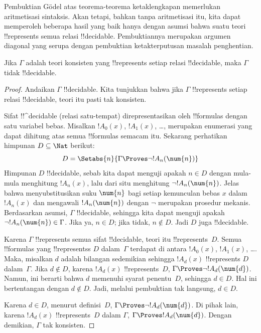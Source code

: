 \documentclass[../../../include/open-logic-section]{subfiles}
\begin{document}


Pembuktian G\"odel atas teorema-teorema ketaklengkapan memerlukan
aritmetisasi sintaksis. Akan tetapi, bahkan tanpa aritmetisasi itu, kita dapat
memperoleh beberapa hasil yang baik hanya dengan asumsi bahwa suatu teori
!!{represents} semua relasi !!{decidable}. Pembuktiannya merupakan argumen
diagonal yang serupa dengan pembuktian ketakterputusan masalah penghentian.

\begin{thm}
Jika $\Gamma$ adalah teori konsisten yang !!{represents} setiap relasi
!!{decidable}, maka $\Gamma$ tidak !!{decidable}.
\end{thm}

\begin{proof}
Andaikan $\Gamma$ !!{decidable}. Kita tunjukkan bahwa jika $\Gamma$
!!{represents} setiap relasi !!{decidable}, teori itu pasti tak konsisten.

Sifat !!^{decidable} (relasi satu-tempat) direpresentasikan oleh
!!{formula}s dengan satu variabel bebas. Misalkan $!A_0(x)$, $!A_1(x)$,
\dots, merupakan enumerasi yang dapat dihitung atas semua !!{formula}s
semacam itu. Sekarang perhatikan himpunan $D \subseteq \Nat$ berikut:
\[
D = \Setabs{n}{\Gamma \Proves \lnot !A_n(\num{n})}
\]
Himpunan $D$ !!{decidable}, sebab kita dapat menguji apakah $n \in D$
dengan mula-mula menghitung $!A_n(x)$, lalu dari situ menghitung $\lnot
!A_n(\num{n})$. Jelas bahwa menyubstitusikan suku $\num{n}$ bagi setiap
kemunculan bebas $x$ dalam $!A_n(x)$ dan mengawali $!A_n(\num{n})$ dengan
$\lnot$ merupakan prosedur mekanis. Berdasarkan asumsi, $\Gamma$
!!{decidable}, sehingga kita dapat menguji apakah $\lnot !A_n(\num{n}) \in
\Gamma$. Jika ya, $n \in D$; jika tidak, $n \notin D$. Jadi $D$ juga
!!{decidable}.

Karena $\Gamma$ !!{represents} semua sifat !!{decidable}, teori itu
!!{represents}~$D$. Semua !!{formula}s yang !!{represents}s $D$
dalam~$\Gamma$ terdapat di antara $!A_0(x)$, $!A_1(x)$, \dots. Maka,
misalkan $d$ adalah bilangan sedemikian sehingga $!A_d(x)$ !!{represents}
$D$ dalam~$\Gamma$. Jika $d \notin D$, karena $!A_d(x)$ !!{represents}~$D$,
$\Gamma \Proves \lnot !A_d(\num{d})$. Namun, ini berarti bahwa $d$
memenuhi syarat penentu~$D$, sehingga $d \in D$. Hal ini bertentangan dengan
$d \notin D$. Jadi, melalui pembuktian tak langsung, $d \in D$.

Karena $d \in D$, menurut definisi~$D$, $\Gamma \Proves \lnot
!A_d(\num{d})$. Di pihak lain, karena $!A_d(x)$ !!{represents}~$D$
dalam $\Gamma$, $\Gamma \Proves !A_d(\num{d})$. Dengan demikian,
$\Gamma$ tak konsisten.
\end{proof}
\end{document}

